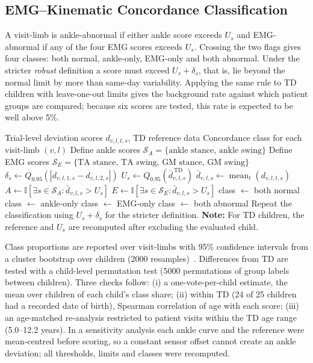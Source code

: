 \documentclass[conference]{IEEEtran}
\begin{document}
\subsection{EMG–Kinematic Concordance Classification}
A visit-limb is ankle-abnormal if either ankle score exceeds $U_s$ and EMG-abnormal if any of the four EMG scores exceeds $U_s$. Crossing the two flags gives four classes: both normal, ankle-only, EMG-only and both abnormal. Under the stricter \emph{robust} definition a score must exceed $U_s+\delta_s$, that is, lie beyond the normal limit by more than same-day variability. Applying the same rule to TD children with leave-one-out limits gives the background rate against which patient groups are compared; because six scores are tested, this rate is expected to be well above 5\%.
\begin{algorithm}[t]
\caption{Repeatability-Calibrated EMG--Kinematic Concordance}
\label{alg:concordance}
\begin{algorithmic}[1]
\Require Trial-level deviation scores $d_{v,l,t,s}$, TD reference data
\Ensure Concordance class for each visit-limb $(v,l)$
\State Define ankle scores $\mathcal{S}_{A}=\{\text{ankle stance, ankle swing}\}$
\State Define EMG scores $\mathcal{S}_{E}=\{\text{TA stance, TA swing, GM stance, GM swing}\}$
    \State $\delta_s \gets Q_{0.95}\!\left(
    \left|d_{v,l,1,s}-d_{v,l,2,s}\right|\right)$
    \State $U_s \gets Q_{0.95}\!\left(\bar d_{v,l,s}^{\,\mathrm{TD}}\right)$
\EndFor
{}
    \State $\bar d_{v,l,s}\gets \operatorname{mean}_{t}(d_{v,l,t,s})$
    \State $A\gets\mathbb{I}\!\left[
    \exists s\in\mathcal{S}_{A}:\bar d_{v,l,s}>U_s\right]$
    \State $E\gets\mathbb{I}\!\left[
    \exists s\in\mathcal{S}_{E}:\bar d_{v,l,s}>U_s\right]$
        \State class $\gets$ both normal
        \State class $\gets$ ankle-only
        \State class $\gets$ EMG-only
    \Else
        \State class $\gets$ both abnormal
    \EndIf
\EndFor
\State Repeat the classification using $U_s+\delta_s$ for the stricter definition.
\Statex \textbf{Note:} For TD children, the reference and $U_s$ are recomputed after excluding the evaluated child.
\end{algorithmic}
\end{algorithm}

Class proportions are reported over visit-limbs with 95\% confidence intervals from a cluster bootstrap over children (2000 resamples)~\cite{efron1993bootstrap}. Differences from TD are tested with a child-level permutation test (5000 permutations of group labels between children). Three checks follow: (i) a one-vote-per-child estimate, the mean over children of each child's class share; (ii) within TD (24 of 25 children had a recorded date of birth), Spearman correlation of age with each score; (iii) an age-matched re-analysis restricted to patient visits within the TD age range (5.0--12.2 years). In a sensitivity analysis each ankle curve and the reference were mean-centred before scoring, so a constant sensor offset cannot create an ankle deviation; all thresholds, limits and classes were recomputed.
\end{document}
